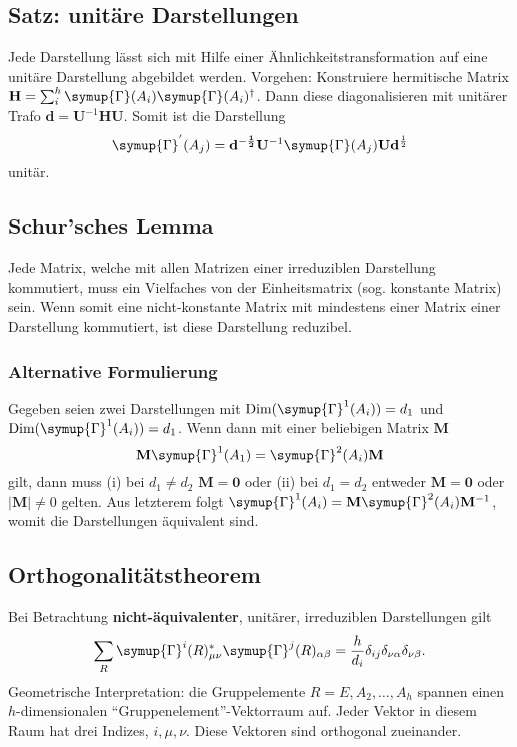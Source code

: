 \documentclass[
  captions=tableheading,  %
  titlepage=firstiscover, %
]{scrartcl}
\begin{document}
\subsection{Satz: unitäre Darstellungen}
Jede Darstellung lässt sich mit Hilfe einer Ähnlichkeitstransformation auf eine 
unitäre Darstellung abgebildet werden. Vorgehen: Konstruiere hermitische Matrix 
${\mathbf{H} = \sum_i^h \symup{\Gamma}(A_i) \symup{\Gamma} (A_i)^\dagger}$. Dann diese diagonalisieren mit unitärer Trafo 
$\mathbf{d} = \mathbf{U}^{-1} \mathbf{H} \mathbf{U}$. Somit ist
die Darstellung 
\begin{equation*}
  \symup{\Gamma}^{'}(A_j) = \mathbf{d^{-\frac{1}{2}}} \mathbf{U}^{-1} \symup{\Gamma}(A_j) \mathbf{U} \mathbf{d}^{\frac{1}{2}}
\end{equation*}
unitär.
\subsection{Schur'sches Lemma}
Jede Matrix, welche mit allen Matrizen einer irreduziblen Darstellung kommutiert,
muss ein Vielfaches von der Einheitsmatrix (sog. konstante Matrix) sein. 
Wenn somit eine nicht-konstante Matrix mit mindestens einer Matrix einer Darstellung kommutiert, 
ist diese Darstellung reduzibel.
\subsubsection{Alternative Formulierung}
Gegeben seien zwei Darstellungen mit $\text{Dim}(\symup{\Gamma}^1(A_i)) = d_1$ und $\text{Dim}(\symup{\Gamma}^1(A_i)) = d_1$.
Wenn dann mit einer beliebigen Matrix $\mathbf{M}$
\begin{equation*}
  \mathbf{M}\symup{\Gamma}^1(A_1) = \symup{\Gamma}^2(A_i) \mathbf{M}
\end{equation*}
gilt, dann muss (i) bei $d_1 \neq d_2$ $\mathbf{M} = \mathbf{0}$ oder (ii) bei $d_1 = d_2$ entweder 
$\mathbf{M} = \mathbf{0}$ oder $|\mathbf{M}| \neq 0$ gelten.
Aus letzterem folgt $\symup{\Gamma}^1(A_i) = \mathbf{M} \symup{\Gamma}^2(A_i) \mathbf{M}^{-1} $, womit 
die Darstellungen äquivalent sind.
\subsection{Orthogonalitätstheorem}
\label{sub:orth}
Bei Betrachtung \textbf{nicht-äquivalenter}, unitärer, irreduziblen Darstellungen gilt
\begin{equation*}
  \sum_R \symup{\Gamma}^i(R)^*_{\mu \nu}\symup{\Gamma}^j(R)_{\alpha \beta} = \frac{h}{d_i} \delta_{ij}\delta_{\nu \alpha}\delta_{\nu \beta}.
\end{equation*}
Geometrische Interpretation: die Gruppelemente $R = E, A_2, \ldots, A_h$ spannen einen 
$h$-dimensionalen \enquote{Gruppenelement}-Vektorraum auf.
Jeder Vektor in diesem Raum hat drei Indizes, $i, \mu, \nu$.
Diese Vektoren sind orthogonal zueinander.
\end{document}
